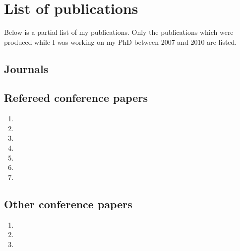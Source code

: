 \chapter*{List of publications}

Below is a partial list of my publications. Only the publications which were produced while I was working on my PhD between 2007 and 2010 are listed. 


\section*{Journals}

\begin{enumerate}[label={$[\arabic*]$}]
\item {}
\end{enumerate}

\section*{Refereed conference papers}
 
\begin{enumerate}[resume*]
\item {}
\item {}
\item {}
\item {}
\item {}
\item {}
\item {}
\end{enumerate}


\section*{Other conference papers}

\begin{enumerate}[resume*]
\item {}
\item {}
\item {}
\end{enumerate}